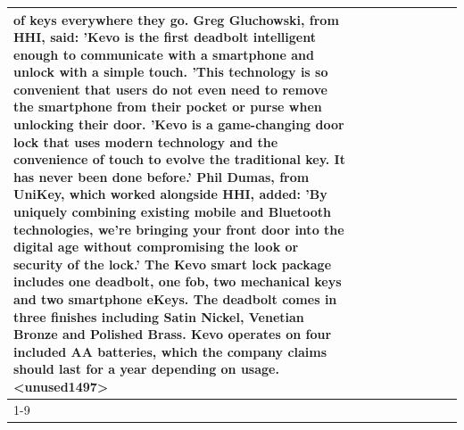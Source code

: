 \begin{table}[H]
\begin{tabular}{lllrlllll}
of keys everywhere they go. Greg Gluchowski, from HHI, said: 'Kevo is the first deadbolt intelligent enough to communicate with a smartphone and unlock with a simple touch. 'This technology is so convenient that users do not even need to remove the smartphone from their pocket or purse when unlocking their door. 'Kevo is a game-changing door lock that uses modern technology and the convenience of touch to evolve the traditional key. It has never been done before.' Phil Dumas, from UniKey, which worked alongside HHI, added: 'By uniquely combining existing mobile and Bluetooth technologies, we’re bringing your front door into the digital age without compromising the look or security of the lock.' The Kevo smart lock package includes one deadbolt, one fob, two mechanical keys and two smartphone eKeys. The deadbolt comes in three finishes including Satin Nickel, Venetian Bronze and Polished Brass. Kevo operates on four included AA batteries, which the company claims should last for a year depending on usage.<unused1497> \\
\cline{1-9}

\end{tabular}
\end{table}
